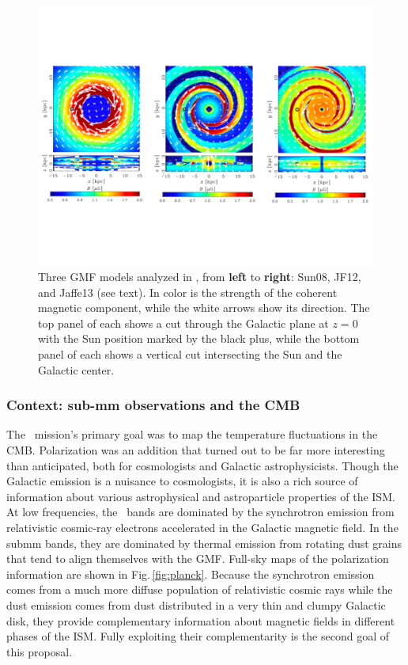 \begin{figure}
\includegraphics[width=\textwidth]{views_lowres.pdf}
\caption{Three GMF models analyzed in \citet{pipXLII}, from {\bf left}
    to {\bf right}: Sun08, JF12, and Jaffe13 (see text). In 
color is the strength of the coherent magnetic component, while the white arrows show its direction. The top panel of each shows a cut through the Galactic plane at $z=0$ with the Sun position marked by the black plus, while the bottom panel of each shows a vertical cut intersecting the Sun and the Galactic center.} 
\label{fig:gmfs}
\end{figure} 

\subsubsection*{Context:  sub-mm observations and the CMB}

The \planck\ mission's primary goal was to map the temperature fluctuations in the CMB.  Polarization was an addition that turned out to be far more interesting than anticipated, both for cosmologists and Galactic astrophysicists. Though the Galactic emission is a nuisance to cosmologists, it is also a rich source of information about various astrophysical and astroparticle properties of the ISM. At low frequencies, the \planck\ bands are dominated by the synchrotron emission from relativistic cosmic-ray electrons accelerated in the Galactic magnetic field. In the submm bands, they are dominated by thermal emission from rotating dust grains that tend to align themselves with the GMF.  Full-sky maps of the polarization information are shown in Fig.\,\ref{fig:planck}.   Because the synchrotron emission comes from a much more diffuse population of relativistic cosmic rays while the dust emission comes from dust distributed in a very thin and clumpy Galactic disk, they provide complementary information about magnetic fields in different phases of the ISM.  Fully exploiting their complementarity is the second goal of this proposal.  

